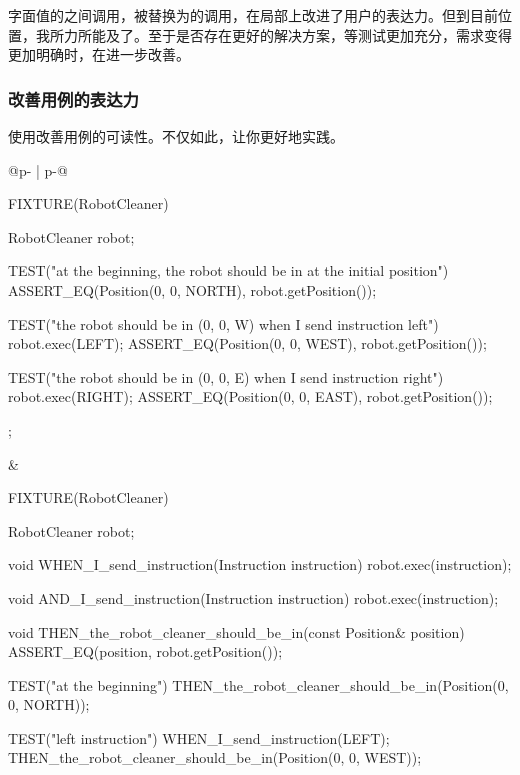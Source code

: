 \begin{content}
字面值的之间调用，被替换为的调用，在局部上改进了用户的表达力。但到目前位置，我所力所能及了。至于是否存在更好的解决方案，等测试更加充分，需求变得更加明确时，在进一步改善。

\subsubsection{改善用例的表达力}

使用改善用例的可读性。不仅如此，让你更好地实践。

\begin{tabular}{@{}p{} 
                 | p{}@{}}
\begin{c++}[caption={test/robot-cleaner/TestRobotCleaner.h}]
FIXTURE(RobotCleaner)
{
    RobotCleaner robot;
    
    TEST("at the beginning, the robot should be in at the initial position")
    {
        ASSERT_EQ(Position(0, 0, NORTH), robot.getPosition());
    }

    TEST("the robot should be in (0, 0, W) when I send instruction left")
    {
        robot.exec(LEFT);
        ASSERT_EQ(Position(0, 0, WEST), robot.getPosition());
    }

    TEST("the robot should be in (0, 0, E) when I send instruction right")
    {
        robot.exec(RIGHT);
        ASSERT_EQ(Position(0, 0, EAST), robot.getPosition());
    }
};
\end{c++}
&
\begin{c++}[caption={test/robot-cleaner/TestRobotCleaner.h}]
FIXTURE(RobotCleaner)
{
    RobotCleaner robot;
    
    void WHEN_I_send_instruction(Instruction instruction)
    {
        robot.exec(instruction);
    }
    
    void AND_I_send_instruction(Instruction instruction)
    {
        robot.exec(instruction);
    }    

    void THEN_the_robot_cleaner_should_be_in(const Position& position)
    {
        ASSERT_EQ(position, robot.getPosition());
    }
    
    TEST("at the beginning")
    {
        THEN_the_robot_cleaner_should_be_in(Position(0, 0, NORTH));
    }

    TEST("left instruction")
    {
        WHEN_I_send_instruction(LEFT);
        THEN_the_robot_cleaner_should_be_in(Position(0, 0, WEST));
    }

}
\end{c++}
\end{tabular}
\end{content}
